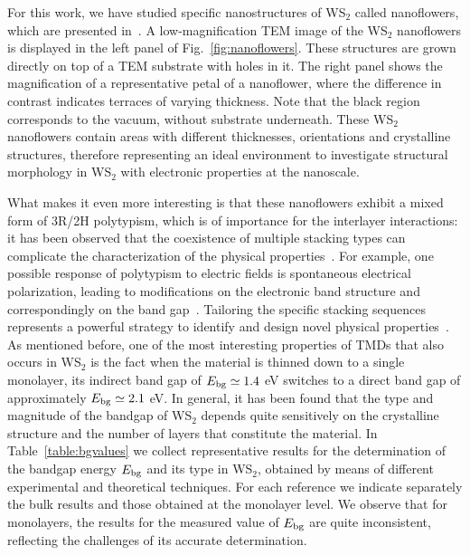 For this work, we have studied specific nanostructures of WS$_2$ called nanoflowers,
which are presented in~\cite{SabryaWS2}. 
%
A low-magnification TEM image of the WS$_2$ nanoflowers is displayed
in the left panel of Fig.~\ref{fig:nanoflowers}.
%
These structures are grown directly on top of a TEM substrate with holes in it. 
%
The right panel shows the magnification of a representative petal of a nanoflower,
where the difference in contrast indicates terraces of varying thickness.
%
Note that the black region corresponds to the vacuum, without
substrate underneath.
%
These WS$_2$ nanoflowers contain areas with different thicknesses, orientations
and crystalline structures, therefore representing an ideal environment to investigate
structural morphology in WS$_2$ with electronic properties at the nanoscale.

What makes it even more interesting is that these nanoflowers exhibit a mixed form of 3R/2H polytypism, 
which is of importance for the interlayer interactions: 
it has been observed that the coexistence of multiple stacking types can complicate
the characterization of the physical properties~\cite{Na:2018}.
%
For example, one possible response of polytypism to electric fields is
 spontaneous electrical polarization, leading to modifications on the 
 electronic band structure and correspondingly on the band gap~\cite{Li:2016}.
Tailoring the specific stacking sequences
represents a powerful strategy to identify and design novel physical properties~\cite{SabryaWS2}.\\

As mentioned before, one of the most interesting properties of TMDs that also
occurs in WS$_2$ is the fact when the material
is thinned down to a single monolayer, its indirect band gap of
$E_{\rm bg}\simeq 1.4$ eV
switches to a direct band gap of approximately $E_{\rm bg}\simeq 2.1$ eV.
%
In general, it has been found that the type and magnitude of the bandgap
of WS$_2$ depends quite sensitively on the crystalline structure and
the number of layers that constitute the material.
%
In Table~\ref{table:bgvalues} we collect
representative results for the determination of the bandgap energy $E_{\rm bg}$
and its type in WS$_2$, obtained by means of different experimental and theoretical techniques.
%
For each reference we indicate separately the bulk results and those
obtained at the monolayer level.
%
We observe that for monolayers, the results for the measured
value of $E_{\rm bg}$ are quite inconsistent, 
reflecting the challenges of its accurate determination.

